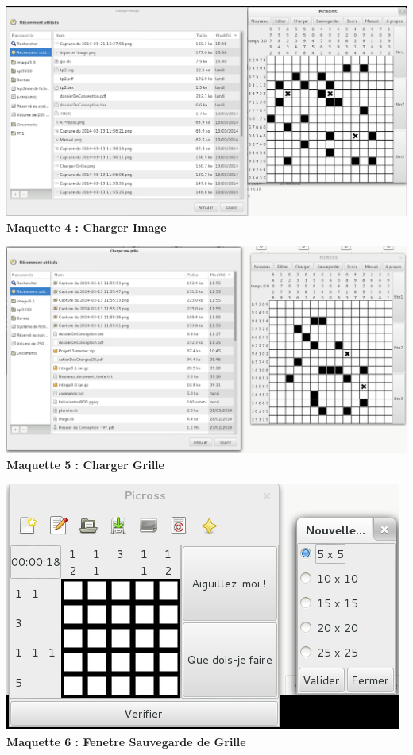 \begin{center}
                \includegraphics[scale=0.6]{data/screenMaquette/ChargerImage.png}\\
                \textbf{Maquette 4 : Charger Image}
\end{center}

\begin{center}
                \includegraphics[scale=0.6]{data/screenMaquette/ChargerGrille.png}\\
                \textbf{Maquette 5 : Charger Grille}
\end{center}

\begin{center}
                \includegraphics[scale=0.6]{data/screenMaquette/FenetreNewGrille.png}\\
                \textbf{Maquette 6 : Fenetre Sauvegarde de Grille}
\end{center}

